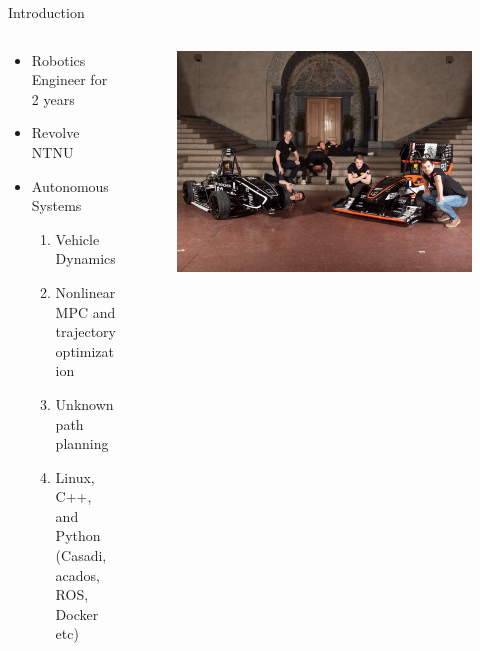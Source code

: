     \begin{frame}{Introduction}
        \begin{columns}
            \begin{column}{0.5\textwidth}
                \begin{itemize}
                    \item Robotics Engineer for 2 years
                    \item  Revolve NTNU
                    \item Autonomous Systems
                        \begin{enumerate}
                            \item Vehicle Dynamics
                            \item Nonlinear MPC and trajectory optimization
                            \item Unknown path planning
                            \item Linux, C++, and Python \\
                             (Casadi, acados, ROS, Docker etc)
                        \end{enumerate}
                \end{itemize}
            \end{column}

            \begin{column}{0.5\textwidth}
                \begin{figure}
                    \centering
                    \includegraphics[width=1.0\textwidth]{figures/atmos.jpg}
                \end{figure}
            \end{column}
        \end{columns}
    \end{frame}


